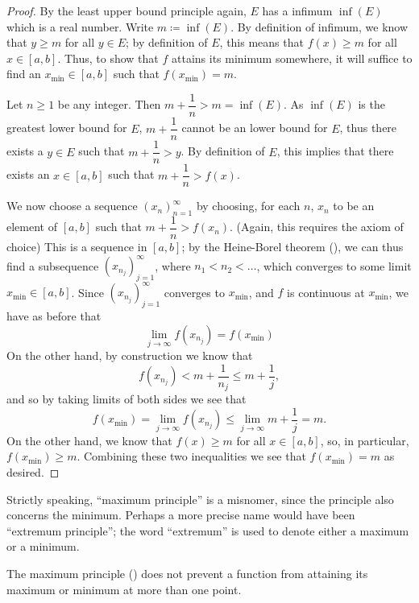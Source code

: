 \begin{proof}
  By the least upper bound principle again, \(E\) has a infimum \(\inf(E)\) which is a real number.
  Write \(m \coloneqq \inf(E)\).
  By definition of infimum, we know that \(y \geq m\) for all \(y \in E\);
  by definition of \(E\), this means that \(f(x) \geq m\) for all \(x \in [a, b]\).
  Thus, to show that \(f\) attains its minimum somewhere, it will suffice to find an \(x_{\min} \in [a, b]\) such that \(f(x_{\min}) = m\).

  Let \(n \geq 1\) be any integer.
  Then \(m + \dfrac{1}{n} > m = \inf(E)\).
  As \(\inf(E)\) is the greatest lower bound for \(E\), \(m + \dfrac{1}{n}\) cannot be an lower bound for \(E\), thus there exists a \(y \in E\) such that \(m + \dfrac{1}{n} > y\).
  By definition of \(E\), this implies that there exists an \(x \in [a, b]\) such that \(m + \dfrac{1}{n} > f(x)\).

  We now choose a sequence \((x_n)_{n = 1}^\infty\) by choosing, for each \(n\), \(x_n\) to be an element of \([a, b]\) such that \(m + \dfrac{1}{n} > f(x_n)\).
  (Again, this requires the axiom of choice)
  This is a sequence in \([a, b]\);
  by the Heine-Borel theorem (), we can thus find a subsequence \((x_{n_j})_{j = 1}^\infty\), where \(n_1 < n_2 < \dots\), which converges to some limit \(x_{\min} \in [a, b]\).
  Since \((x_{n_j})_{j = 1}^\infty\) converges to \(x_{\min}\), and \(f\) is continuous at \(x_{\min}\), we have as before that
  \[
    \lim_{j \to \infty} f(x_{n_j}) = f(x_{\min})
  \]
  On the other hand, by construction we know that
  \[
    f(x_{n_j}) < m + \dfrac{1}{n_j} \leq m + \dfrac{1}{j},
  \]
  and so by taking limits of both sides we see that
  \[
    f(x_{\min}) = \lim_{j \to \infty} f(x_{n_j}) \leq \lim_{j \to \infty} m + \dfrac{1}{j} = m.
  \]
  On the other hand, we know that \(f(x) \geq m\) for all \(x \in [a, b]\), so, in particular, \(f(x_{\min}) \geq m\).
  Combining these two inequalities we see that \(f(x_{\min}) = m\) as desired.
\end{proof}

\begin{rmk}\label{i:9.6.8}
  Strictly speaking, ``maximum principle'' is a misnomer, since the principle also concerns the minimum.
  Perhaps a more precise name would have been ``extremum principle'';
  the word ``extremum'' is used to denote either a maximum or a minimum.
\end{rmk}

\begin{note}
  The maximum principle () does not prevent a function from attaining its maximum or minimum at more than one point.
\end{note}

